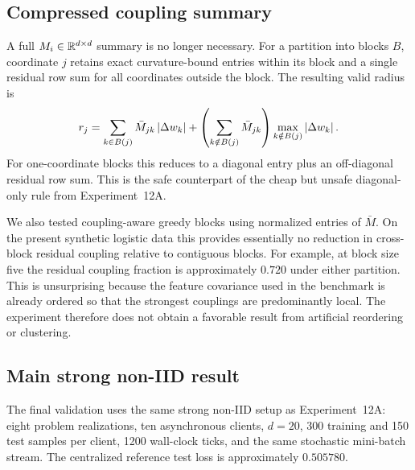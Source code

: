 \subsection{Compressed coupling summary}

A full $M_i\in\mathbb{R}^{d\times d}$ summary is no longer necessary. For a partition into blocks $B$, coordinate $j$ retains exact curvature-bound entries within its block and a single residual row sum for all coordinates outside the block. The resulting valid radius is
\begin{equation}
 r_j
 =
 \sum_{k\in B(j)}\bar M_{jk}\left|\Delta w_k\right|
 +
 \left(\sum_{k\notin B(j)}\bar M_{jk}\right)
 \max_{k\notin B(j)}\left|\Delta w_k\right|.
 \label{eq:12b-block-residual}
\end{equation}
For one-coordinate blocks this reduces to a diagonal entry plus an off-diagonal residual row sum. This is the safe counterpart of the cheap but unsafe diagonal-only rule from Experiment~12A.

We also tested coupling-aware greedy blocks using normalized entries of $\bar M$. On the present synthetic logistic data this provides essentially no reduction in cross-block residual coupling relative to contiguous blocks. For example, at block size five the residual coupling fraction is approximately $0.720$ under either partition. This is unsurprising because the feature covariance used in the benchmark is already ordered so that the strongest couplings are predominantly local. The experiment therefore does not obtain a favorable result from artificial reordering or clustering.

\subsection{Main strong non-IID result}

The final validation uses the same strong non-IID setup as Experiment~12A: eight problem realizations, ten asynchronous clients, $d=20$, 300 training and 150 test samples per client, 1200 wall-clock ticks, and the same stochastic mini-batch stream. The centralized reference test loss is approximately $0.505780$.


